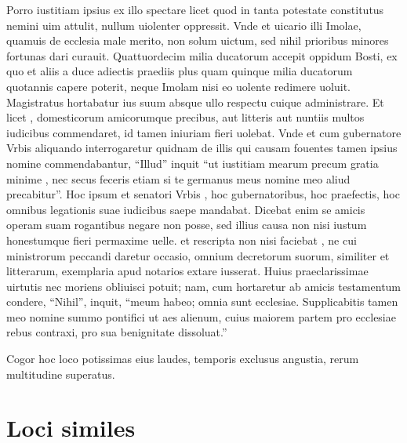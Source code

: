 \documentclass[a5paper,twoside]{article}
\begin{document}
Porro iustitiam ipsius ex illo spectare licet quod in tanta  potestate constitutus nemini uim attulit, nullum uiolenter oppressit. Vnde et uicario illi Imolae, quamuis de ecclesia male merito, non solum uictum, sed nihil prioribus minores fortunas dari curauit. Quattuordecim  milia ducatorum accepit   oppidum Bosti, ex quo et aliis a duce adiectis praediis plus quam quinque milia ducatorum quotannis capere poterit, neque Imolam nisi eo uolente redimere uoluit. Magistratus hortabatur ius suum absque ullo respectu cuique administrare. Et licet , domesticorum amicorumque  precibus, aut litteris aut nuntiis multos iudicibus commendaret, id tamen   iniuriam fieri uolebat. Vnde et cum  gubernatore Vrbis aliquando interrogaretur quidnam de illis  qui  causam fouentes tamen ipsius nomine commendabantur, ``Illud'' inquit ``ut iustitiam mearum precum gratia minime , nec secus feceris etiam si te germanus meus  nomine meo aliud precabitur''.  Hoc ipsum et senatori Vrbis , hoc gubernatoribus, hoc praefectis, hoc omnibus legationis suae iudicibus saepe mandabat.  Dicebat enim se amicis operam suam rogantibus negare non posse, sed illius causa non nisi iustum honestumque fieri permaxime uelle.   et rescripta non nisi  faciebat , ne cui ministrorum peccandi daretur occasio, omnium decretorum suorum, similiter et litterarum, exemplaria apud notarios extare iusserat.  Huius praeclarissimae uirtutis nec moriens obliuisci potuit; nam, cum hortaretur ab amicis testamentum condere, ``Nihil'', inquit, ``meum habeo; omnia sunt ecclesiae. Supplicabitis tamen meo nomine summo pontifici ut aes alienum, cuius maiorem partem pro  ecclesiae rebus contraxi, pro sua benignitate dissoluat.''

Cogor hoc loco potissimas eius  laudes,  temporis exclusus angustia,   rerum multitudine superatus.

\endnumbering

\newpage

\section*{Loci similes}
\end{document}
